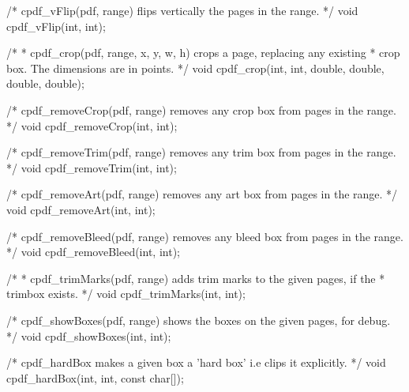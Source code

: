 /* cpdf_vFlip(pdf, range) flips vertically the pages in the range. */
void cpdf_vFlip(int, int);

/*
 * cpdf_crop(pdf, range, x, y, w, h) crops a page, replacing any existing
 * crop box. The dimensions are in points.
 */
void cpdf_crop(int, int, double, double, double, double);

/* cpdf_removeCrop(pdf, range) removes any crop box from pages in the range. */
void cpdf_removeCrop(int, int);

/* cpdf_removeTrim(pdf, range) removes any trim box from pages in the range. */
void cpdf_removeTrim(int, int);

/* cpdf_removeArt(pdf, range) removes any art box from pages in the range. */
void cpdf_removeArt(int, int);

/* cpdf_removeBleed(pdf, range) removes any bleed box from pages in the range.
 */
void cpdf_removeBleed(int, int);

/*
 * cpdf_trimMarks(pdf, range) adds trim marks to the given pages, if the
 * trimbox exists.
 */
void cpdf_trimMarks(int, int);

/* cpdf_showBoxes(pdf, range) shows the boxes on the given pages, for debug. */
void cpdf_showBoxes(int, int);

/* cpdf_hardBox makes a given box a 'hard box' i.e clips it explicitly. */
void cpdf_hardBox(int, int, const char[]);

